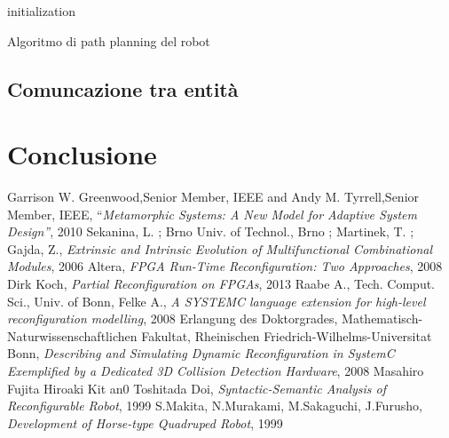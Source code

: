 \documentclass[11pt]{article} %
\begin{document}
\begin{algorithm}[H]
 initialization\;
\caption{Algoritmo di path planning del robot}
\end{algorithm}

\subsection{Comuncazione tra entità}

\section{Conclusione}



\begin{thebibliography}{1}
 Garrison W. Greenwood,Senior Member, IEEE and Andy M. Tyrrell,Senior Member, IEEE, ``\textit{Metamorphic Systems: A New Model for Adaptive System Design''}, 2010
 Sekanina, L. ; Brno Univ. of Technol., Brno ; Martinek, T. ; Gajda, Z., \textit{Extrinsic and Intrinsic Evolution of Multifunctional Combinational Modules}, 2006
 Altera, \textit{FPGA Run-Time Reconfiguration: Two Approaches}, 2008
 Dirk Koch, \textit{Partial Reconfiguration on FPGAs}, 2013
 Raabe A., Tech. Comput. Sci., Univ. of Bonn, Felke A., \textit{A SYSTEMC language extension for high-level reconfiguration modelling}, 2008
 Erlangung des Doktorgrades, Mathematisch-Naturwissenschaftlichen Fakultat, Rheinischen Friedrich-Wilhelms-Universitat Bonn, \textit{Describing and Simulating Dynamic Reconfiguration in SystemC Exemplified by a Dedicated 3D Collision Detection Hardware}, 2008
 Masahiro Fujita Hiroaki Kit an0 Toshitada Doi, \textit{Syntactic-Semantic Analysis of Reconfigurable Robot}, 1999
 S.Makita, N.Murakami, M.Sakaguchi, J.Furusho, \textit{Development of Horse-type Quadruped Robot}, 1999
\end{thebibliography}
\end{document}
